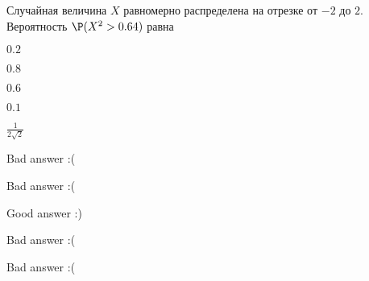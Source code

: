 
\begin{question}
Случайная величина \(X\) равномерно распределена на отрезке от \(-2\) до
\(2\). Вероятность \(\P(X^2>0.64)\) равна
\begin{answerlist}
  \item \(0.2\)
  \item \(0.8\)
  \item \(0.6\)
  \item \(0.1\)
  \item \(\frac{1}{2\sqrt{2}}\)
\end{answerlist}
\end{question}

\begin{solution}
\begin{answerlist}
  \item Bad answer :(
  \item Bad answer :(
  \item Good answer :)
  \item Bad answer :(
  \item Bad answer :(
\end{answerlist}
\end{solution}

